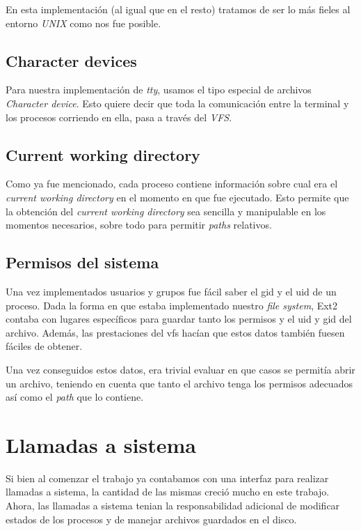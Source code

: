 \documentclass[a4paper,10pt]{article}
\begin{document}
En esta implementación (al igual que en el resto) tratamos de ser lo más fieles al entorno \textit{UNIX} como nos fue posible.

\subsection{Character devices}
Para nuestra implementación de \textit{tty}, usamos el tipo especial de archivos \textit{Character device}.
Esto quiere decir que toda la comunicación entre la terminal y los procesos corriendo en ella, pasa a través del \textit{VFS}.

\subsection{Current working directory}
    
Como ya fue mencionado, cada proceso contiene información sobre cual era el \textit{current working directory} en
el momento en que fue ejecutado. Esto permite que la obtención del \textit{current working directory} sea sencilla
y manipulable en los momentos necesarios, sobre todo para permitir \textit{paths} relativos.

    
\subsection{Permisos del sistema}
Una vez implementados usuarios y grupos fue fácil saber el gid y el uid de un proceso. Dada la forma en que estaba
implementado nuestro \textit{file system}, Ext2 contaba con lugares específicos para guardar tanto los permisos y el
uid y gid del archivo. Además, las prestaciones del vfs hacían que estos datos también fuesen fáciles de obtener.

Una vez conseguidos estos datos, era trivial evaluar en que casos se permitía abrir un archivo, teniendo en cuenta
que tanto el archivo tenga los permisos adecuados así como el \textit{path} que lo contiene.

\section{Llamadas a sistema}

Si bien al comenzar el trabajo ya contabamos con una interfaz para realizar llamadas a sistema, la cantidad de las mismas
creció mucho en este trabajo. Ahora, las llamadas a sistema tenian la responsabilidad adicional de modificar estados de
los procesos y de manejar archivos guardados en el disco.
\end{document}
